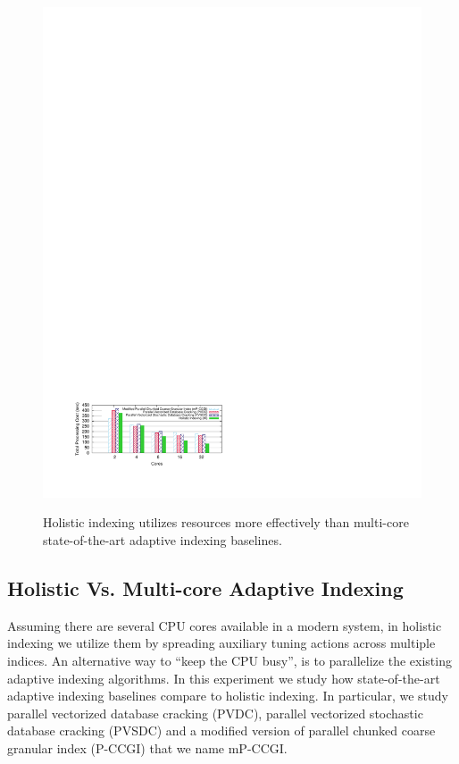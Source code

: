 \begin{figure}[!htb]
\begin{center}
\includegraphics[trim=1.8cm 2cm 0cm 22.4cm]{Figures/holistic/multicore}
\vspace{-0.25 in}
\caption{Holistic indexing utilizes resources more effectively than multi-core state-of-the-art adaptive indexing baselines.}
\vspace{-0.7 cm}
\label{fig:multicore}
\end{center}
\end{figure}


\subsection{Holistic Vs. Multi-core Adaptive Indexing}
\label{subsec:multicore}

Assuming there are  several CPU cores available in a modern system, 
in holistic indexing we utilize them by spreading auxiliary tuning actions across multiple indices.
An alternative way to ``keep the CPU busy'', is to parallelize the existing adaptive indexing algorithms.
In this experiment we study how state-of-the-art adaptive indexing baselines compare to holistic indexing. In particular, we study parallel vectorized database cracking (PVDC), parallel vectorized stochastic database cracking (PVSDC) \cite{efficient_cracking} and a modified version of parallel chunked coarse granular index (P-CCGI) \cite{multicore_adaptive} that we name mP-CCGI.

